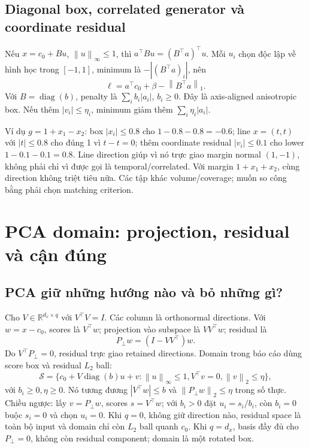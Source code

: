 \documentclass[11pt,a4paper]{article}
\newcommand{\R}{\mathbb R}
\newcommand{\norm}[1]{\left\lVert#1\right\rVert}
\newcommand{\diag}{\operatorname{diag}}
\newcommand{\Sset}{\mathcal S}
\theoremstyle{definition}
\begin{document}
\subsection{Diagonal box, correlated generator và coordinate residual}
Nếu $x=c_0+Bu$, $\norm{u}_\infty\le1$, thì
$a^\top Bu=(B^\top a)^\top u$. Mỗi $u_i$ chọn độc lập về hình học trong
$[-1,1]$, minimum là $-|(B^\top a)_i|$, nên
\begin{equation}
\ell=a^\top c_0+\beta-\norm{B^\top a}_1.
\end{equation}
Với $B=\diag(b)$, penalty là $\sum_i b_i|a_i|$, $b_i\ge0$. Đây là
axis-aligned anisotropic box. Nếu thêm $|v_i|\le\eta_i$, minimum giảm
thêm $\sum_i\eta_i|a_i|$.

Ví dụ $g=1+x_1-x_2$: box $|x_i|\le0.8$ cho $1-0.8-0.8=-0.6$;
line $x=(t,t)$ với $|t|\le0.8$ cho đúng 1 vì $t-t=0$;
thêm coordinate residual $|v_i|\le0.1$ cho lower $1-0.1-0.1=0.8$.
Line direction giúp vì nó trực giao margin normal $(1,-1)$, không phải
chỉ vì được gọi là temporal/correlated. Với margin $1+x_1+x_2$, cùng
direction không triệt tiêu nữa. Các tập khác volume/coverage; muốn so công
bằng phải chọn matching criterion.

\section{PCA domain: projection, residual và cận đúng}
\subsection{PCA giữ những hướng nào và bỏ những gì?}
Cho $V\in\R^{d_x\times q}$ với $V^\top V=I$. Các column là orthonormal
directions. Với $w=x-c_0$, scores là $V^\top w$; projection vào subspace
là $VV^\top w$; residual là
\begin{equation}
P_\perp w=(I-VV^\top)w.
\end{equation}
Do $V^\top P_\perp=0$, residual trực giao retained directions. Domain
trong báo cáo dùng score box và residual $L_2$ ball:
\begin{equation}
\Sset=\{c_0+V\diag(b)u+v:\norm{u}_\infty\le1,
V^\top v=0,\norm{v}_2\le\eta\},
\end{equation}
với $b_i\ge0,\eta\ge0$. Nó tương đương
$|V^\top w|\le b$ và $\norm{P_\perp w}_2\le\eta$ trong số thực. Chiều
ngược: lấy $v=P_\perp w$, scores $s=V^\top w$; với $b_i>0$ đặt
$u_i=s_i/b_i$, còn $b_i=0$ buộc $s_i=0$ và chọn $u_i=0$.
Khi $q=0$, không giữ direction nào, residual space là toàn bộ input và
domain chỉ còn $L_2$ ball quanh $c_0$. Khi $q=d_x$, basis đầy đủ cho
$P_\perp=0$, không còn residual component; domain là một rotated box.
\end{document}
